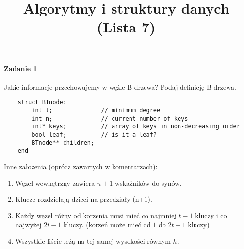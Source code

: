 \documentclass[18pt]{extarticle}
\begin{document}
\large
{}\selectfont

\title{Algorytmy i struktury danych (Lista 7)}
\date{}
\maketitle

\paragraph{Zadanie 1} Jakie informacje przechowujemy w węźle B-drzewa? Podaj definicję B-drzewa. \\

\begin{lstlisting}
    struct BTnode:
        int t;              // minimum degree
        int n;              // current number of keys
        int* keys;          // array of keys in non-decreasing order
        bool leaf;          // is it a leaf?
        BTnode** children;
    end
\end{lstlisting}
Inne założenia (oprócz zawartych w komentarzach):
\begin{enumerate}
    \item Węzeł wewnętrzny zawiera $n+1$ wskaźników do synów.
    \item Klucze rozdzielają dzieci na przedziały (n+1).
    \item Każdy węzeł różny od korzenia musi mieć co najmniej $t-1$ kluczy i co najwyżej $2t-1$ kluczy. (korzeń może mieć od $1$ do $2t-1$ kluczy)
    \item Wszystkie liście leżą na tej samej wysokości równym $h$.
\end{enumerate}
\end{document}
